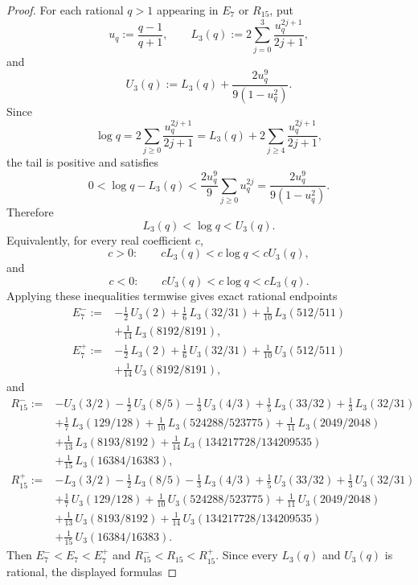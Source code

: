 \documentclass[11pt,a4paper]{amsart}
\theoremstyle{plain}
\theoremstyle{definition}
\theoremstyle{remark}
\begin{document}
\begin{proof}
  For each rational \(q>1\) appearing in \(E_7\) or \(R_{15}\), put
  \[
    u_q:=\frac{q-1}{q+1},
    \qquad
    L_3(q):=2\sum_{j=0}^{3}\frac{u_q^{2j+1}}{2j+1},
  \]
  and
  \[
    U_3(q):=L_3(q)+\frac{2u_q^9}{9(1-u_q^2)}.
  \]
  Since
  \[
    \log q
    =
    2\sum_{j\ge 0}\frac{u_q^{2j+1}}{2j+1}
    =
    L_3(q)+2\sum_{j\ge 4}\frac{u_q^{2j+1}}{2j+1},
  \]
  the tail is positive and satisfies
  \[
    0<\log q-L_3(q)
    <
    \frac{2u_q^9}{9}\sum_{j\ge 0}u_q^{2j}
    =
    \frac{2u_q^9}{9(1-u_q^2)}.
  \]
  Therefore
  \begin{equation}\label{eq:s3-log-lower-upper-bounds}
    L_3(q)<\log q<U_3(q).
  \end{equation}
  Equivalently, for every real coefficient \(c\),
  \[
    c>0:\qquad cL_3(q)<c\log q<cU_3(q),
  \]
  and
  \[
    c<0:\qquad cU_3(q)<c\log q<cL_3(q).
  \]
  Applying these inequalities termwise gives exact rational endpoints
  \begin{align*}
    E_7^-
    :={}&
    -\frac12\,U_3(2)
    +\frac16\,L_3(32/31)
    +\frac1{10}\,L_3(512/511) \\
    &+\frac1{14}\,L_3(8192/8191), \\
    E_7^+
    :={}&
    -\frac12\,L_3(2)
    +\frac16\,U_3(32/31)
    +\frac1{10}\,U_3(512/511) \\
    &+\frac1{14}\,U_3(8192/8191),
  \end{align*}
  and
  \begin{align*}
    R_{15}^-
    :={}&
    -U_3(3/2)
    -\frac12\,U_3(8/5)
    -\frac13\,U_3(4/3)
    +\frac15\,L_3(33/32)
    +\frac13\,L_3(32/31) \\
    &+\frac17\,L_3(129/128)
    +\frac1{10}\,L_3(524288/523775)
    +\frac1{11}\,L_3(2049/2048) \\
    &+\frac1{13}\,L_3(8193/8192)
    +\frac1{14}\,L_3(134217728/134209535) \\
    &+\frac1{15}\,L_3(16384/16383), \\
    R_{15}^+
    :={}&
    -L_3(3/2)
    -\frac12\,L_3(8/5)
    -\frac13\,L_3(4/3)
    +\frac15\,U_3(33/32)
    +\frac13\,U_3(32/31) \\
    &+\frac17\,U_3(129/128)
    +\frac1{10}\,U_3(524288/523775)
    +\frac1{11}\,U_3(2049/2048) \\
    &+\frac1{13}\,U_3(8193/8192)
    +\frac1{14}\,U_3(134217728/134209535) \\
    &+\frac1{15}\,U_3(16384/16383).
  \end{align*}
  Then \(E_7^-<E_7<E_7^+\) and \(R_{15}^-<R_{15}<R_{15}^+\). Since
  every \(L_3(q)\) and \(U_3(q)\) is rational, the displayed formulas

\end{proof}
\end{document}

